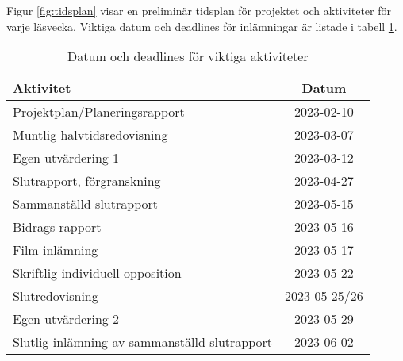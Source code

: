 Figur \ref{fig:tidsplan} visar en preliminär tidsplan för projektet och
aktiviteter för varje läsvecka. Viktiga datum och deadlines för inlämningar är
listade i tabell \ref{tab:deadlines}.


\begin{table}[h]
\caption{Datum och deadlines för viktiga aktiviteter}
\begin{center}
\begin{tabular}{| l | c |}
\hline
\bfseries{Aktivitet}                                 &  \bfseries{Datum} \\
\hline
Projektplan/Planeringsrapport                        &  2023-02-10\\ 
Muntlig halvtidsredovisning                          &  2023-03-07\\ 
Egen utvärdering 1                                   &  2023-03-12\\ 
Slutrapport, förgranskning                           &  2023-04-27\\ 
Sammanställd slutrapport                             &  2023-05-15\\ 
Bidrags rapport                                      &  2023-05-16\\ 
Film inlämning                                       &  2023-05-17\\ 
Skriftlig individuell opposition                     &  2023-05-22\\ 
Slutredovisning                                      &  2023-05-25/26\\ 
Egen utvärdering 2                                   &  2023-05-29\\ 
Slutlig inlämning av sammanställd slutrapport        &  2023-06-02\\ 
    \hline
\end{tabular}
\label{tab:deadlines}
\end{center}
\end{table}


